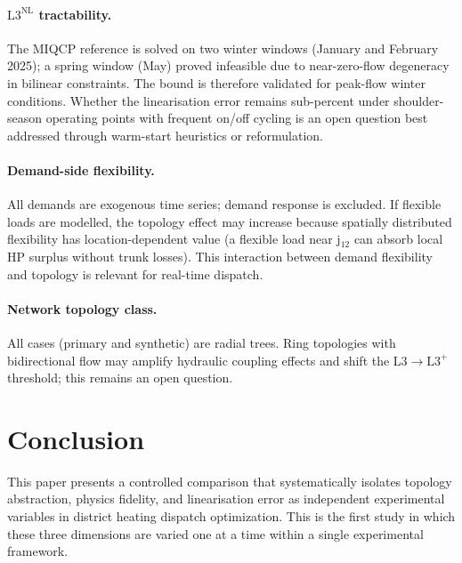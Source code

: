 \documentclass[a4paper,fleqn]{cas-dc}
\newcommand{\Lplus}{\mathrm{L3}^{+}}
\newcommand{\Lnl}{\mathrm{L3}^{\mathrm{NL}}}
\begin{document}
\paragraph{$\Lnl$ tractability.}
The MIQCP reference is solved on two winter windows (January and
February 2025); a spring window (May) proved infeasible due to
near-zero-flow degeneracy in bilinear constraints. The bound is
therefore validated for peak-flow winter conditions. Whether the
linearisation error remains sub-percent under shoulder-season
operating points with frequent on/off cycling is an open question
best addressed through warm-start heuristics or reformulation.

\paragraph{Demand-side flexibility.}
All demands are exogenous time series; demand response is
excluded. If flexible loads are modelled, the topology effect may
increase because spatially distributed flexibility has
location-dependent value (a flexible load near j$_{12}$ can
absorb local HP surplus without trunk losses). This interaction
between demand flexibility and topology is relevant for real-time
dispatch.

\paragraph{Network topology class.}
All cases (primary and synthetic) are radial trees. Ring topologies
with bidirectional flow may amplify hydraulic coupling effects and
shift the L3$\to\Lplus$ threshold; this remains an open question.
\section{Conclusion}
\label{sec:conclusion}

This paper presents a controlled comparison that systematically
isolates topology abstraction, physics fidelity, and linearisation
error as independent experimental variables in district heating
dispatch optimization. This is the first study
in which these three dimensions are varied one at a time within a
single experimental framework.
\end{document}
